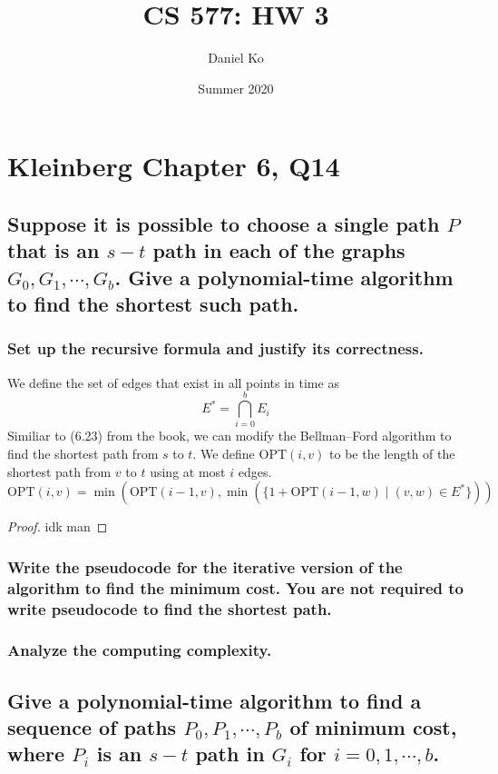 \documentclass[11pt]{scrartcl}
\title{CS 577: HW 3}
\author{Daniel Ko}
\date{Summer 2020}
\newcommand{\opt}{\text{OPT}}
\begin{document}
\maketitle

\section{
  Kleinberg Chapter 6, Q14
 }

\subsection{
	Suppose it is possible to choose a single path $P$ that is an $s-t$ path in
	each of the graphs $G_0, G_1, \cdots , G_b$. Give a polynomial-time algorithm
	to find the shortest such path.
}
\subsubsection{
	Set up the recursive formula and justify its correctness.
}
We define the set of edges that exist in all points in time as $$E^* = \bigcap_{i=0}^{b} E_i$$
Similiar to (6.23) from the book, we can modify the Bellman–Ford algorithm 
to find the shortest path from $s$ to $t$. We define $\opt(i,v)$ to be the length of the shortest
path from $v$ to $t$ using at most $i$ edges. 
$$\opt(i,v) = \min(\opt(i-1,v),\min(\{1 + \opt(i-1,w) \mid  (v,w) \in E^*\}))$$

\begin{proof}
	idk man
\end{proof}

\subsubsection{
	Write the pseudocode for the iterative version of the algorithm to find the minimum
	cost. You are not required to write pseudocode to find the shortest path.
}




\subsubsection{
	Analyze the computing complexity.
}


\subsection{
	Give a polynomial-time algorithm to find a sequence of paths
	$P_0, P_1, \cdots , P_b$ of minimum cost, where $P_i$ is an $s-t$ path in $G_i$ for
	$i = 0, 1, \cdots, b$.
}
\end{document}
